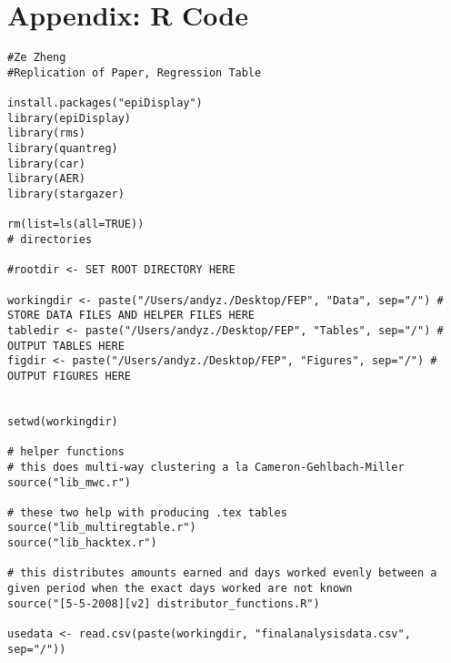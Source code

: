 \documentclass{article}
\begin{document}
\section{Appendix: R Code}
\begin{verbatim}
#Ze Zheng
#Replication of Paper, Regression Table

install.packages("epiDisplay")
library(epiDisplay)
library(rms)
library(quantreg)
library(car)
library(AER)
library(stargazer)

rm(list=ls(all=TRUE))
# directories

#rootdir <- SET ROOT DIRECTORY HERE

workingdir <- paste("/Users/andyz./Desktop/FEP", "Data", sep="/") # STORE DATA FILES AND HELPER FILES HERE
tabledir <- paste("/Users/andyz./Desktop/FEP", "Tables", sep="/") # OUTPUT TABLES HERE
figdir <- paste("/Users/andyz./Desktop/FEP", "Figures", sep="/") # OUTPUT FIGURES HERE


setwd(workingdir)

# helper functions
# this does multi-way clustering a la Cameron-Gehlbach-Miller
source("lib_mwc.r")

# these two help with producing .tex tables
source("lib_multiregtable.r")
source("lib_hacktex.r")

# this distributes amounts earned and days worked evenly between a given period when the exact days worked are not known
source("[5-5-2008][v2] distributor_functions.R")

usedata <- read.csv(paste(workingdir, "finalanalysisdata.csv", sep="/"))


\end{verbatim}
\end{document}
